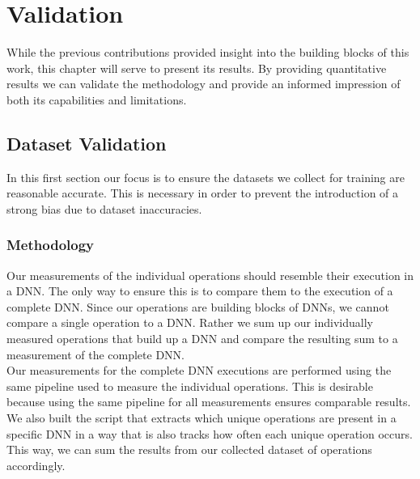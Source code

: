 \chapter{Validation}\label{chap:contrib3}

While the previous contributions provided insight into the building blocks of this work, this chapter will serve to present its results. By providing quantitative results we can validate the methodology and provide an informed impression of both its capabilities and limitations. 


\section{Dataset Validation}
In this first section our focus is to ensure the datasets we collect for training are reasonable accurate. This is necessary in order to prevent the introduction of a strong bias due to dataset inaccuracies.

\subsection{Methodology}
Our measurements of the individual operations should resemble their execution in a DNN. The only way to ensure this is to compare them to the execution of a complete DNN. Since our operations are building blocks of DNNs, we cannot compare a single operation to a DNN. Rather we sum up our individually measured operations that build up a DNN and compare the resulting sum to a measurement of the complete DNN. \\
Our measurements for the complete DNN executions are performed using the same pipeline used to measure the individual operations. This is desirable because using the same pipeline for all measurements ensures comparable results. \\
We also built the script that extracts which unique operations are present in a specific DNN in a way that is also tracks how often each unique operation occurs. This way, we can sum the results from our collected dataset of operations accordingly.


